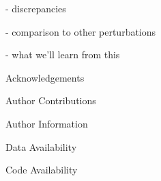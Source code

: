 \documentclass{natureprintstyle}
\begin{document}
- discrepancies

- comparison to other perturbations

- what we'll learn from this


% 


\begin{addendum}
  
\item [Acknowledgements] 

\item[Author Contributions]

\item[Author  Information]  

\item[Data Availability] 
    
\item[Code Availability] 
    
\end{addendum}
\end{document}
